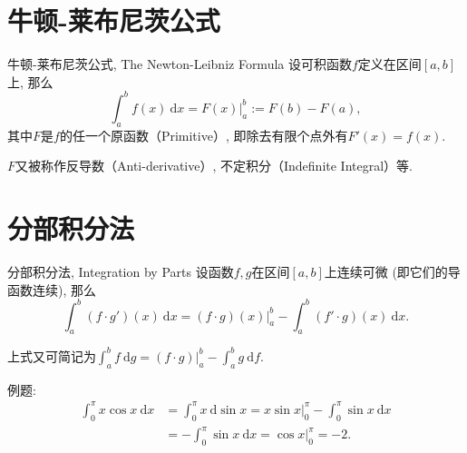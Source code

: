 
\section{牛顿-莱布尼茨公式}


\begin{frame}

\begin{block}{牛顿-莱布尼茨公式, The Newton-Leibniz Formula}
设可积函数$f$定义在区间$[a,b]$上, 那么
\[\int_a^b f(x) ~ \mathrm{d}x = \left.F(x)\right\vert_a^b := F(b) - F(a),\]
其中$F$是$f$的任一个原函数（Primitive）, 即{\color{zkblue!50}除去有限个点外有}$F'(x) = f(x)$.
\end{block}

\vspace{2em}
\pause

$F$又被称作反导数（Anti-derivative）, 不定积分（Indefinite Integral）等.

\end{frame}



\section{分部积分法}


\begin{frame}

\begin{block}{分部积分法, Integration by Parts}
设函数$f,g$在区间$[a,b]$上连续可微 (即它们的导函数连续), 那么
\[\int_a^b (f\cdot g')(x) ~ \mathrm{d}x = (f\cdot g)(x)|_a^b - \int_a^b (f'\cdot g)(x) ~ \mathrm{d}x.\]

\pause

上式又可简记为\(\displaystyle \int_a^b f ~ \mathrm{d}g = (f\cdot g)|_a^b - \int_a^b g ~ \mathrm{d}f.\)
\end{block}

\pause

例题:
\begin{align*}
\int_0^{\pi} x \cos x ~ \mathrm{d}x & = \int_0^{\pi} x ~ \mathrm{d}\sin x = x\sin x|_0^{\pi} - \int_0^{\pi} \sin x ~ \mathrm{d}x \\
& = - \int_0^{\pi} \sin x ~ \mathrm{d}x = \cos x|_0^{\pi} = -2.
\end{align*}

\end{frame}

